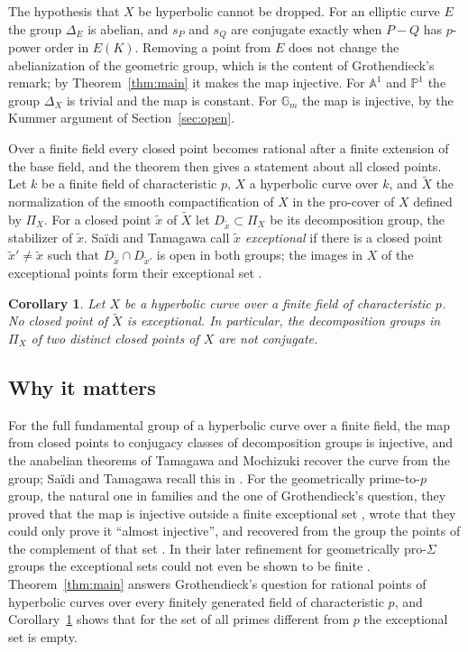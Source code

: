 \documentclass[11pt]{amsart}
\newtheorem{maincor}[theorem]{Corollary}
\theoremstyle{remark}
\begin{document}
The hypothesis that $X$ be hyperbolic cannot be dropped. For an elliptic curve $E$ the group $\Delta_E$ is abelian, and $s_P$ and $s_Q$ are conjugate exactly when $P-Q$ has $p$-power order in $E(K)$. Removing a point from $E$ does not change the abelianization of the geometric group, which is the content of Grothendieck's remark; by Theorem~\ref{thm:main} it makes the map injective. For $\mathbb A^1$ and $\mathbb P^1$ the group $\Delta_X$ is trivial and the map is constant. For $\mathbb G_m$ the map is injective, by the Kummer argument of Section~\ref{sec:open}.

Over a finite field every closed point becomes rational after a finite extension of the base field, and the theorem then gives a statement about all closed points. Let $k$ be a finite field of characteristic $p$, $X$ a hyperbolic curve over $k$, and $\widetilde X$ the normalization of the smooth compactification of $X$ in the pro-cover of $X$ defined by $\Pi_X$. For a closed point $\tilde x$ of $\widetilde X$ let $D_{\tilde x}\subset\Pi_X$ be its decomposition group, the stabilizer of $\tilde x$. Sa\"idi and Tamagawa call $\tilde x$ \emph{exceptional} if there is a closed point $\tilde x'\ne\tilde x$ such that $D_{\tilde x}\cap D_{\tilde x'}$ is open in both groups; the images in $X$ of the exceptional points form their exceptional set \cite[Definitions 1.3, 1.5, 1.10]{ST09}.

\begin{maincor}\label{cor:closed}
Let $X$ be a hyperbolic curve over a finite field of characteristic $p$. No closed point of $\widetilde X$ is exceptional. In particular, the decomposition groups in $\Pi_X$ of two distinct closed points of $X$ are not conjugate.
\end{maincor}

\subsection{Why it matters}
For the full fundamental group of a hyperbolic curve over a finite field, the map from closed points to conjugacy classes of decomposition groups is injective, and the anabelian theorems of Tamagawa and Mochizuki recover the curve from the group; Sa\"idi and Tamagawa recall this in \cite[Introduction]{ST09}. For the geometrically prime-to-$p$ group, the natural one in families and the one of Grothendieck's question, they proved that the map is injective outside a finite exceptional set \cite[Proposition 1.8(vi), Corollary 1.11]{ST09}, wrote that they could only prove it ``almost injective'', and recovered from the group the points of the complement of that set \cite[Introduction]{ST09}. In their later refinement for geometrically pro-$\Sigma$ groups the exceptional sets could not even be shown to be finite \cite[Introduction, pp.~4--5]{ST18}. Theorem~\ref{thm:main} answers Grothendieck's question for rational points of hyperbolic curves over every finitely generated field of characteristic $p$, and Corollary~\ref{cor:closed} shows that for the set of all primes different from $p$ the exceptional set is empty.
\end{document}
